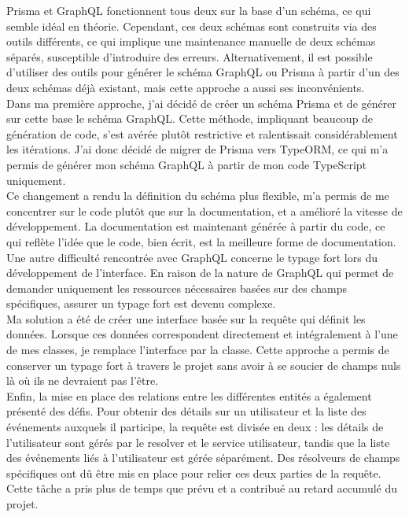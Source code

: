 Prisma et GraphQL fonctionnent tous deux sur la base d'un schéma, ce qui semble idéal en théorie.
Cependant, ces deux schémas sont construits via des outils différents, ce qui implique une maintenance manuelle de deux schémas séparés, susceptible d'introduire des erreurs.
Alternativement, il est possible d'utiliser des outils pour générer le schéma GraphQL ou Prisma à partir d'un des deux schémas déjà existant, mais cette approche a aussi ses inconvénients.\\

Dans ma première approche, j'ai décidé de créer un schéma Prisma et de générer sur cette base le schéma GraphQL. Cette méthode, impliquant beaucoup de génération de code, s'est avérée plutôt restrictive et ralentissait considérablement les itérations.
J'ai donc décidé de migrer de Prisma vers TypeORM, ce qui m'a permis de générer mon schéma GraphQL à partir de mon code TypeScript uniquement.\\

Ce changement a rendu la définition du schéma plus flexible, m'a permis de me concentrer sur le code plutôt que sur la documentation, et a amélioré la vitesse de développement.
La documentation est maintenant générée à partir du code, ce qui reflète l'idée que le code, bien écrit, est la meilleure forme de documentation.\\

Une autre difficulté rencontrée avec GraphQL concerne le typage fort lors du développement de l'interface.
En raison de la nature de GraphQL qui permet de demander uniquement les ressources nécessaires basées sur des champs spécifiques, assurer un typage fort est devenu complexe.\\

Ma solution a été de créer une interface basée sur la requête qui définit les données.
Lorsque ces données correspondent directement et intégralement à l'une de mes classes, je remplace l'interface par la classe.
Cette approche a permis de conserver un typage fort à travers le projet sans avoir à se soucier de champs nuls là où ils ne devraient pas l'être.\\

Enfin, la mise en place des relations entre les différentes entités a également présenté des défis.
Pour obtenir des détails sur un utilisateur et la liste des événements auxquels il participe, la requête est divisée en deux :
les détails de l'utilisateur sont gérés par le resolver et le service utilisateur, tandis que la liste des événements liés à l'utilisateur est gérée séparément.
Des résolveurs de champs spécifiques ont dû être mis en place pour relier ces deux parties de la requête.
Cette tâche a pris plus de temps que prévu et a contribué au retard accumulé du projet.